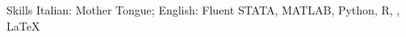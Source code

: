 
\begin{rubric}{Skills}
\entry*[Languages]
	Italian: Mother Tongue; English: Fluent
	\textsc{STATA}, MATLAB, Python, R, , \LaTeX

\end{rubric}
